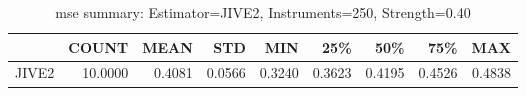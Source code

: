 \begin{table}[ht]
\centering
\caption{mse summary: Estimator=JIVE2, Instruments=250, Strength=0.40}
\begin{tabular}{lrrrrrrrr}
\toprule
 & COUNT & MEAN & STD & MIN & 25\% & 50\% & 75\% & MAX \\
\midrule
JIVE2 & 10.0000 & 0.4081 & 0.0566 & 0.3240 & 0.3623 & 0.4195 & 0.4526 & 0.4838 \\
\bottomrule
\end{tabular}
\end{table}
